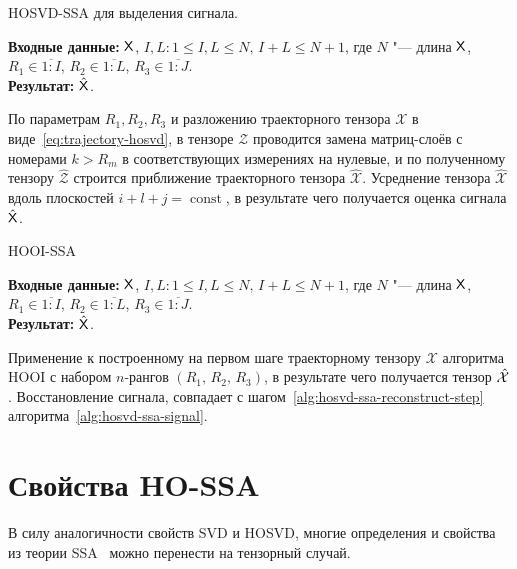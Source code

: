 \documentclass[specialist,
    substylefile = spbu.rtx,
    subf,href,colorlinks=true, 12pt]{disser}
\theoremstyle{plain}
\theoremstyle{definition}
\theoremstyle{remark}
\newcommand{\Input}{\textbf{Входные данные: }}
\newcommand{\Output}{\textbf{Результат: }}
\begin{document}
    \begin{algorithm}[!ht]
        \caption{HOSVD-SSA для выделения сигнала.}
        \label{alg:hosvd-ssa-signal}
        \Input $\mathsf{X}$, $I,L: 1\leqslant I,L \leqslant N,\, I + L \leqslant N + 1$, где $N$ "--- длина $\mathsf{X}$, $R_1 \in \overline{1:I}$,
        $R_2 \in \overline{1:L}$, $R_3 \in \overline{1:J}$.\\
        \Output $\hat{\mathsf{X}}$.
        
        \begin{algorithmic}[1]
            \State По параметрам $R_1, R_2, R_3$ и разложению траекторного тензора $\mathcal{X}$
            в виде~\eqref{eq:trajectory-hosvd},
            в тензоре $\mathcal{Z}$ проводится замена матриц-слоёв с номерами $k>R_m$ в соответствующих измерениях
            на нулевые, и по полученному тензору $\hat{\mathcal{Z}}$
            строится приближение траекторного тензора $\hat{\mathcal{X}}$.
            \State \label{alg:hosvd-ssa-reconstruct-step} 
            Усреднение тензора $\hat{\mathcal{X}}$ вдоль плоскостей $i+l+j=\operatorname{const}$,
            в результате чего получается оценка сигнала $\hat{\mathsf{X}}$.
        \end{algorithmic}
    \end{algorithm}

    \begin{algorithm}[!ht]
        \caption{HOOI-SSA}
        \label{alg:hooi-ssa}
        \Input $\mathsf{X}$, $I,L: 1\leqslant I,L \leqslant N,\, I + L \leqslant N + 1$, где $N$ "--- длина $\mathsf{X}$, $R_1 \in \overline{1:I}$,
        $R_2 \in \overline{1:L}$, $R_3 \in \overline{1:J}$.\\
        \Output $\hat{\mathsf{X}}$.

        \begin{algorithmic}[1]
            \State Применение к построенному на первом шаге траекторному тензору $\mathcal{X}$ алгоритма
            HOOI с набором $n$-рангов $(R_1,\, R_2,\, R_3)$, в результате чего получается тензор $\hat{\mathcal{X}}$.
            \State Восстановление сигнала, совпадает с шагом~\ref{alg:hosvd-ssa-reconstruct-step} 
            алгоритма~\ref{alg:hosvd-ssa-signal}.
        \end{algorithmic}
    \end{algorithm}


    \section{Свойства HO-SSA}\label{sec:HO-SSA-properties}
    В силу аналогичности свойств SVD и HOSVD, многие определения и свойства из теории SSA~\cite{ssa} можно перенести на тензорный случай.
\end{document}
